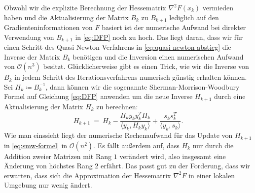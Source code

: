 Obwohl wir die explizite Berechnung der Hessematrix $\nabla^2 F(x_k)$ vermieden haben und die Aktualisierung der Matrix $B_k$ zu $B_{k+1}$ lediglich auf den Gradienteninformationen von $F$ basiert ist der numerische Aufwand bei direkter Verwendung von $B_{k+1}$ in \eqref{eq:DFP} noch zu hoch.
Das liegt daran, dass wir für einen Schritt des Quasi-Newton Verfahrens in \eqref{eq:quasi-newton-abstieg} die Inverse der Matrix $B_k$ benötigen und die Inversion einen numerischen Aufwand von $\mathcal{O}(n^3)$ besitzt.
Glücklicherweise gibt es einen Trick, wie wir die Inverse von $B_k$ in jedem Schritt des Iterationsverfahrens numerisch günstig erhalten können.
Sei $H_k \coloneqq B_k^{-1}$, dann können wir die sogenannte Sherman-Morrison-Woodbury Formel auf Gleichung \eqref{eq:DFP} anwenden um die neue Inverse $H_{k+1}$ durch eine Aktualisierung der Matrix $H_k$ zu berechnen:
\begin{equation}
\label{eq:smw-formel}
H_{k+1} \ = \ H_k - \frac{H_k y_k y_k^T H_k}{\langle y_k, H_k y_k\rangle} + \frac{s_k s_k^T}{\langle y_k, s_k \rangle} . 
\end{equation}
Wie man einssieht liegt der numerische Rechenaufwand für das Update von $H_{k+1}$ in \eqref{eq:smw-formel} in $\mathcal{O}(n^2)$.
Es fällt außerdem auf, dass $H_k$ nur durch die Addition zweier Matrizen mit Rang $1$ verändert wird, also insgesamt eine Änderung von höchstes Rang $2$ erfährt.
Das passt gut zu der Forderung, dass wir erwarten, dass sich die Approximation der Hessematrix $\nabla^2 F$ in einer lokalen Umgebung nur wenig ändert.

